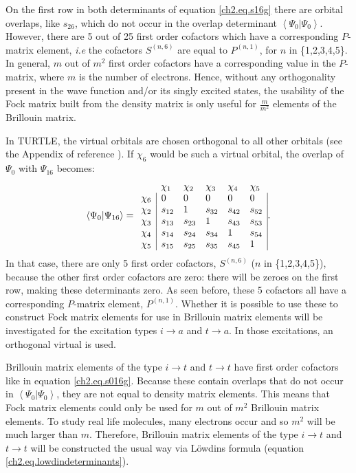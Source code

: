 On the first row in both determinants of equation \ref{ch2.eq.s16g} there are orbital overlaps, like $s_{26}$, which do not occur in the overlap determinant $\left< \Psi_0 | \Psi_0 \right>$. However, there are 5 out of 25 first order cofactors which have a corresponding $P$-matrix element, \textit{i.e} the cofactors $S^{(n,6)}$ are equal to $P^{(n,1)}$, for $n$ in \{1,2,3,4,5\}. In general, $m$ out of $m^2$ first order cofactors have a corresponding value in the $P$-matrix, where $m$ is the number of electrons. Hence, without any orthogonality present in the wave function and/or its singly excited states, the usability of the Fock matrix built from the density matrix is only useful for $\frac{m}{m^2}$ elements of the Brillouin matrix. 

In TURTLE, the virtual orbitals are chosen orthogonal to all other orbitals (see the Appendix of reference \cite{koos1}). If $\chi_6$ would be such a virtual orbital, the overlap of $\Psi_0$ with $\Psi_{16}$ becomes:
\begin{equation}
\left < \Psi_0 | \Psi_{16} \right> =
\begin{array}{llllll}
 &  \chi_1 & \chi_2 & \chi_3 & \chi_4 & \chi_5 \\
 \chi_6 & \multicolumn{1}{|l}{ 0 } & 0 & 0 & 0 & \multicolumn{1}{l|}{ 0 } \\
 \chi_2 & \multicolumn{1}{|l}{ s_{12} } & 1 & s_{32} & s_{42} & \multicolumn{1}{l|}{ s_{52} } \\
 \chi_3 & \multicolumn{1}{|l}{ s_{13} } & s_{23} & 1 & s_{43} & \multicolumn{1}{l|}{ s_{53} } \\
 \chi_4 & \multicolumn{1}{|l}{ s_{14} } & s_{24} & s_{34} & 1 & \multicolumn{1}{l|}{ s_{54} } \\
 \chi_5 & \multicolumn{1}{|l}{ s_{15} } & s_{25} & s_{35} & s_{45} & \multicolumn{1}{l|}{ 1 }
\end{array}.
\label{ch2.eq.s016go}
\end{equation}
In that case, there are only 5 first order cofactors, $S^{(n,6)}$ ($n$ in \{1,2,3,4,5\}), because the other first order cofactors are zero: there will be zeroes on the first row, making these determinants zero. As seen before, these 5 cofactors all have a corresponding $P$-matrix element, $P^{(n,1)}$. Whether it is possible to use these to construct Fock matrix elements for use in Brillouin matrix elements will be investigated for the excitation types $i \rightarrow a$ and $t \rightarrow a$. In those excitations, an orthogonal virtual is used.

Brillouin matrix elements of the type $i \rightarrow t$ and $t \rightarrow t$ have first order cofactors like in equation \ref{ch2.eq.s016g}. Because these contain overlaps that do not occur in $\left< \Psi_0 | \Psi_0 \right>$, they are not equal to density matrix elements. This means that Fock matrix elements could only be used for $m$ out of $m^2$ Brillouin matrix elements. To study real life molecules, many electrons occur and so $m^2$ will be much larger than $m$. Therefore, Brillouin matrix elements of the type $i \rightarrow t$ and $t \rightarrow t$ will be constructed the usual way via L\"{o}wdins formula (equation \ref{ch2.eq.lowdindeterminants}).

